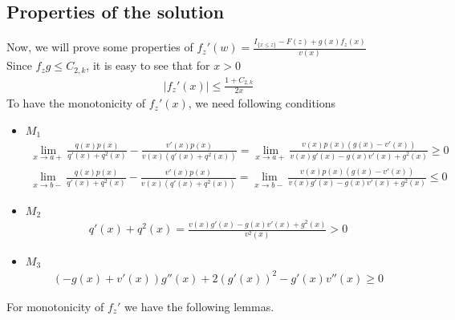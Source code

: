 \documentclass[a4paper,11pt,draft]{article}
\numberwithin{equation}{section}
\theoremstyle{plain}
\theoremstyle{definition}
\theoremstyle{remark}
\renewcommand{\leq}{\leqslant}
\renewcommand{\geq}{\geqslant}
\begin{document}
\subsection{Properties of the solution}
Now, we will prove some properties of
$f_{z}'(w)=\frac{I_{\{x\leq z\}}-F(z)+g(x)f_{z}(x)}{v(x)}$\\
\indent Since $f_{z} g\leq C_{2,k}$, it is easy to see that for $x> 0$
\begin{equation}
	\begin{aligned}
		\vert f_z'(x)\vert\leq \frac{1+C_{2,k}}{2x}  
	\end{aligned}
	\label{eq:3_7_1}
\end{equation}
\indent To have the monotonicity of $f_{z}'(x)$, we need following conditions
\begin{itemize}
	\item $M_{1}$
		\begin{equation}
			\begin{aligned}
				\lim_{x\to a+}
				\frac{q(x)p(x)}{q'(x)+q^{2}(x)}-\frac{v'(x)p(x)}{v(x)(q'(x)+q^{2}(x))}
				=	\lim_{x\to a+}\frac{v(x) p(x)(g(x)-v'(x))}{v(x)g'(x)-g(x)v'(x)+g^{2}(x)}\geq 0
			\end{aligned}
			\label{eq:5_16_1}
		\end{equation}
	\begin{equation}
			\begin{aligned}
				\lim_{x\to b-}
				\frac{q(x)p(x)}{q'(x)+q^{2}(x)}-\frac{v'(x)p(x)}{v(x)(q'(x)+q^{2}(x))}
				=	\lim_{x\to b-}\frac{v(x) p(x)(g(x)-v'(x))}{v(x)g'(x)-g(x)v'(x)+g^{2}(x)}\leq 0
			\end{aligned}
			\label{eq:5_16_6}
		\end{equation}

	\item $M_{2}$
		\begin{equation}
			\begin{aligned}
				q'(x)+q^{2}(x)=\frac{v(x)g'(x)-g(x)v'(x)+g^{2}(x)}{v^{2}(x)}>0
			\end{aligned}
			\label{eq:5_16_2}
		\end{equation}
	\item $M_{3}$
		\begin{equation}
			\begin{aligned}
				(-g(x)+v'(x))g''(x)+2(g'(x))^{2}-g'(x)v''(x)\geq 0
			\end{aligned}
			\label{eq:5_16}
		\end{equation}
\end{itemize}
\indent For monotonicity of $f_{z}'$ we have the following lemmas.
\end{document}
